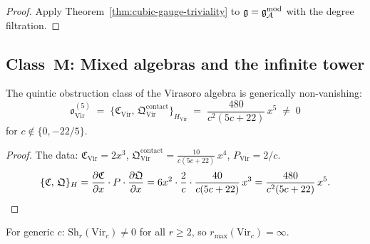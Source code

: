 \begin{proof}
Apply Theorem~\ref{thm:cubic-gauge-triviality} to
$\mathfrak{g} = \mathfrak{g}_{\mathcal{A}}^{\mathrm{mod}}$ with the degree filtration.
\end{proof}



\subsection{Class~$\mathbf{M}$: Mixed algebras and the infinite tower}

\begin{theorem}
\label{thm:thqg-virasoro-quintic}
\ClaimStatusProvedHere
{}
The quintic obstruction class of the Virasoro algebra is
generically non-vanishing:
\begin{equation}%
\mathfrak{o}^{(5)}_{\mathrm{Vir}}
\;=\;
\{\mathfrak{C}_{\mathrm{Vir}},\,
\mathfrak{Q}^{\mathrm{contact}}_{\mathrm{Vir}}\}_{H_{\mathrm{Vir}}}
\;=\;
\frac{480}{c^2(5c+22)}\,x^5
\;\neq\; 0
\end{equation}
for $c \notin \{0, -22/5\}$.
\end{theorem}

\begin{proof}
The data: $\mathfrak{C}_{\mathrm{Vir}} = 2x^3$,\;
$\mathfrak{Q}^{\mathrm{contact}}_{\mathrm{Vir}} =
\frac{10}{c(5c+22)}\,x^4$,\;
$P_{\mathrm{Vir}} = 2/c$.
\[
\{\mathfrak{C},\, \mathfrak{Q}\}_{H}
= \frac{\partial\mathfrak{C}}{\partial x}
 \cdot P \cdot
 \frac{\partial\mathfrak{Q}}{\partial x}
= 6x^2 \cdot \frac{2}{c} \cdot
 \frac{40}{c(5c+22)}\,x^3
= \frac{480}{c^2(5c+22)}\,x^5.
\qedhere
\]
\end{proof}

\begin{theorem}
\label{thm:thqg-virasoro-infinite}
\ClaimStatusProvedHere
{}
For generic $c$: $\mathrm{Sh}_r(\mathrm{Vir}_c) \neq 0$
for all $r \geq 2$, so $r_{\max}(\mathrm{Vir}_c) = \infty$.
\end{theorem}

